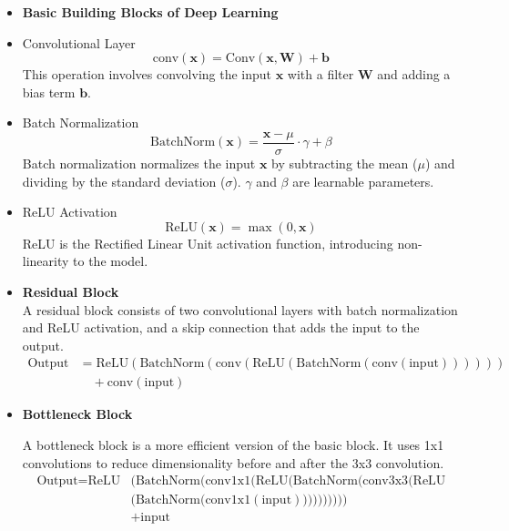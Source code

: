 \begin{itemize}

\item {\textbf{Basic Building Blocks of Deep Learning}}
\item {Convolutional Layer}
\begin{equation}
\text{conv}(\mathbf{x}) = \text{Conv}(\mathbf{x}, \mathbf{W}) + \mathbf{b}
\end{equation}
This operation involves convolving the input $\mathbf{x}$ with a filter $\mathbf{W}$ and adding a bias term $\mathbf{b}$.

\item{Batch Normalization}
\begin{equation}
\text{BatchNorm}(\mathbf{x}) = \frac{\mathbf{x} - \mu}{\sigma} \cdot \gamma + \beta
\end{equation}
Batch normalization normalizes the input $\mathbf{x}$ by subtracting the mean ($\mu$) and dividing by the standard deviation ($\sigma$). $\gamma$ and $\beta$ are learnable parameters.

\item{ReLU Activation}
\begin{equation}
\text{ReLU}(\mathbf{x}) = \max(0, \mathbf{x})
\end{equation}
ReLU is the Rectified Linear Unit activation function, introducing non-linearity to the model.

 \item \textbf{Residual Block} \\
  A residual block consists of two convolutional layers with batch normalization and ReLU activation, and a skip connection that adds the input to the output.
  \begin{equation}
  \begin{split}
  \text{Output} &= \text{ReLU}\left(\text{BatchNorm}\left(\text{conv}\left(\text{ReLU}\left(\text{BatchNorm}\left(\text{conv}(\text{input})\right)\right)\right)\right)\right) \\
  &\quad + \text{conv}(\text{input})
  \end{split}
  \end{equation}
  
  \item \textbf{Bottleneck Block}

  A bottleneck block is a more efficient version of the basic block. It uses 1x1 convolutions to reduce dimensionality before and after the 3x3 convolution.
  \begin{equation}
    \begin{aligned}
    \text{Output} = \text{ReLU}&\bigg(\text{BatchNorm}\Big(\text{conv1x1}\big(\text{ReLU}\big(\text{BatchNorm}\Big(\text{conv3x3}\big(\text{ReLU} \\
    &\big(\text{BatchNorm}\Big(\text{conv1x1}(\text{input})\Big)\big)\big)\Big)\big)\Big)\big)\Big) \bigg) \\
    &+ \text{input}
    \end{aligned}
    \end{equation}
    

 \end{itemize}   


